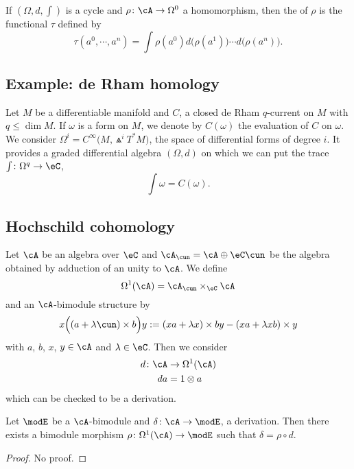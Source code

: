 If $(\Omega,d,\int)$ is a cycle and $\rho\colon \cA\to \Omega^0$ a homomorphism, then the  of $\rho$ is the functional $\tau$ defined by
\begin{equation}
\tau(a^0,\cdots,a^{n})=\int \rho(a^0)d\big( \rho(a^1) \big)\cdots d\big( \rho(a^{n}) \big).
\end{equation}


\subsection{Example: de Rham homology}

Let $M$ be a differentiable manifold and $C$, a closed de Rham $q$-current on $M$ with $q\leq\dim M$. If $\omega$ is a form on $M$, we denote by $C(\omega)$ the evaluation of $C$ on $\omega$. We consider $\Omega^{i}= C^{\infty}\big( M,\Wedge^i T^*M \big)$, the space of differential forms of degree $i$. It provides a graded differential algebra $(\Omega,d)$ on which we can put the trace $\int\colon \Omega^q\to \eC$,
\[ 
  \int \omega=C(\omega).
\]

\subsection{Hochschild cohomology}

Let $\cA$ be an algebra over $\eC$ and $\cA_{\cun}=\cA\oplus\eC\cun$ be the algebra obtained by adduction of an unity to $\cA$. We define
\[ 
  \Omega^1(\cA)=\cA_{\cun}\times_{\eC}\cA
\]
and an $\cA$-bimodule structure by
\[ 
  x\Big( (a+\lambda\cun)\times b \Big)y:=(xa+\lambda x)\times by-(xa+\lambda xb)\times y
\]
with $a$, $b$, $x$, $y\in\cA$ and $\lambda\in\eC$. Then we consider
\begin{equation}
\begin{aligned}
 d\colon \cA&\to \Omega^1(\cA) \\ 
da&= 1\otimes a 
\end{aligned}
\end{equation}
which can be checked to be a derivation.

\begin{proposition}
Let $\modE$ be a $\cA$-bimodule and $\delta\colon \cA\to \modE$, a derivation. Then there exists a bimodule morphism $\rho\colon \Omega^1(\cA)\to \modE$ such that $\delta=\rho\circ d$.
\end{proposition}

\begin{proof}
No proof.
\end{proof}


